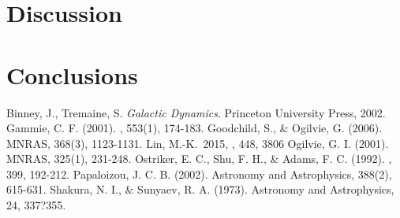 \documentclass[apj]{emulateapj}
\begin{document}
\section{Discussion}


\section{Conclusions}

\begin{thebibliography}{}
 Binney, J., Tremaine, S. \emph{Galactic Dynamics}. Princeton University Press, 2002.
 Gammie, C. F. (2001). \apj, 553(1), 174-183. 
 Goodchild, S., \& Ogilvie, G. (2006). MNRAS, 368(3), 1123-1131. 
 Lin, M.-K.\ 2015, \mnras, 448, 3806  Ogilvie, G. I. (2001). MNRAS, 325(1), 231-248. 
 Ostriker, E. C., Shu, F. H., \& Adams, F. C. (1992). \apj, 399, 192-212. 
 Papaloizou, J. C. B. (2002). Astronomy and Astrophysics, 388(2), 615-631. 
 Shakura, N. I., \& Sunyaev, R. A. (1973). Astronomy and Astrophysics, 24, 337?355.
\end{thebibliography}
\end{document}
